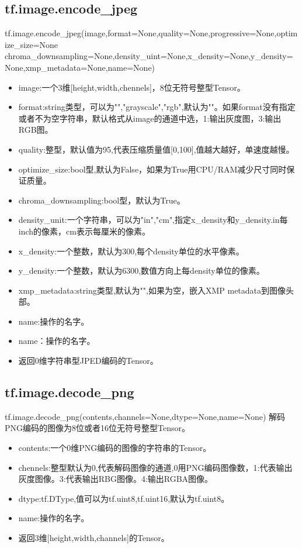 \subsection{tf.image.encode\_jpeg}
tf.image.encode\_jpeg(image,format=None,quality=None,progressive=None,optimize\_size=None\newline
chroma\_downsampling=None,density\_uint=None,x\_density=None,y\_density=None,xmp\_metadata=None,name=None)
\begin{itemize}
	\item image:一个3维[height,width,chennels]，8位无符号整型Tensor。
	\item format:string类型，可以为"","grayscale","rgb",默认为""。如果format没有指定或者不为空字符串，默认格式从image的通道中选，1:输出灰度图，3:输出RGB图。
	\item quality:整型，默认值为95,代表压缩质量值[0,100],值越大越好，单速度越慢。
	\item optimize\_size:bool型,默认为False，如果为True用CPU/RAM减少尺寸同时保证质量。
	\item chroma\_downsampling:bool型，默认为True。
	\item density\_unit:一个字符串，可以为"in","cm",指定x\_density和y\_density.in每inch的像素，cm表示每厘米的像素。
	\item x\_density:一个整数，默认为300,每个density单位的水平像素。
	\item y\_density:一个整数，默认为6300,数值方向上每density单位的像素。
	\item xmp\_metadata:string类型,默认为"",如果为空，嵌入XMP metadata到图像头部。
	\item name:操作的名字。
	\item name：操作的名字。
	\item 返回0维字符串型JPED编码的Tensor。
\end{itemize}
\subsection{tf.image.decode\_png}
tf.image.decode\_png(contents,channels=None,dtype=None,name=None)
解码PNG编码的图像为8位或者16位无符号整型Tensor。
\begin{itemize}
	\item contents:一个0维PNG编码的图像的字符串的Tensor。
	\item chennels:整型默认为0,代表解码图像的通道,0用PNG编码图像数，1:代表输出灰度图像。3:代表输出RBG图像。4:输出RGBA图像。
	\item dtype:tf.DType,值可以为tf.uint8,tf.uint16,默认为tf.uint8。
	\item name:操作的名字。
	\item 返回3维[height,width,channels]的Tensor。

\end{itemize}

